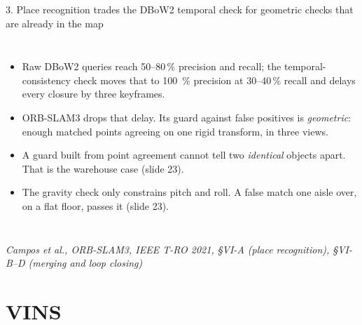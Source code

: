 \documentclass[11pt,aspectratio=169]{beamer}
\newcommand{\src}[1]{\vfill{\tiny\color{black!55}#1}}
\newcommand{\paper}[1]{\textit{#1}}
\begin{document}
\begin{frame}{3. Place recognition trades the DBoW2 temporal check for geometric checks that are already in the map}
\begin{columns}[T]
\begin{itemize}
        \item Raw DBoW2 queries reach 50--80\,\% precision and recall; the
              temporal-consistency check moves that to \SI{100}{\percent}
              precision at 30--40\,\% recall and delays every closure by three
              keyframes.
        \item ORB-SLAM3 drops that delay. Its guard against false positives
              is \emph{geometric}: enough matched points agreeing on one
              rigid transform, in three views.
        \item A guard built from point agreement cannot tell two
              \emph{identical} objects apart. That is the warehouse case
              (slide 23).
        \item The gravity check only constrains pitch and roll. A false match
              one aisle over, on a flat floor, passes it (slide 23).
      \end{itemize}
  \end{columns}
  \src{\paper{Campos et al., ORB-SLAM3, IEEE T-RO 2021, §VI-A (place recognition), §VI-B--D (merging and loop closing)}}
\end{frame}

\section{VINS}
\end{document}
